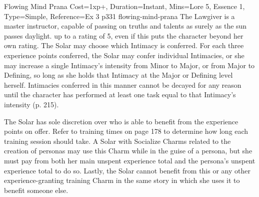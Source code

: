 \begin{Charm}{Flowing Mind Prana}{
    Cost=1xp+,
    Duration=Instant,
    Mins={Lore 5, Essence 1},
    Type=Simple,
    Reference=Ex 3 p331
}{flowing-mind-prana}
    The Lawgiver is a master instructor, capable of passing on truths and
    talents as surely as the sun passes daylight.  up to a rating of 5, even if this
    puts the character beyond her own rating.  The
    Solar may choose which Intimacy is conferred. For each three experience
    points conferred, the Solar may confer individual Intimacies, or she may
    increase a single Intimacy’s intensity from Minor to Major, or from Major
    to Defining, so long as she holds that Intimacy at the Major or Defining
    level herself. Intimacies conferred in this manner cannot be decayed for
    any reason until the character has performed at least one task equal to
    that Intimacy’s intensity (p. 215).

    The Solar has sole discretion over who is able to benefit from the
    experience points on offer. Refer to training times on page 178 to
    determine how long each training session should take.  A Solar with Socialize Charms related to the creation of
    personas may use this Charm while in the guise of a persona, but she must
    pay from both her main unspent experience total and the persona’s unspent
    experience total to do so. Lastly, the Solar cannot benefit from this or
    any other experience-granting training Charm in the same story in which she
    uses it to benefit someone else.
\end{Charm}




